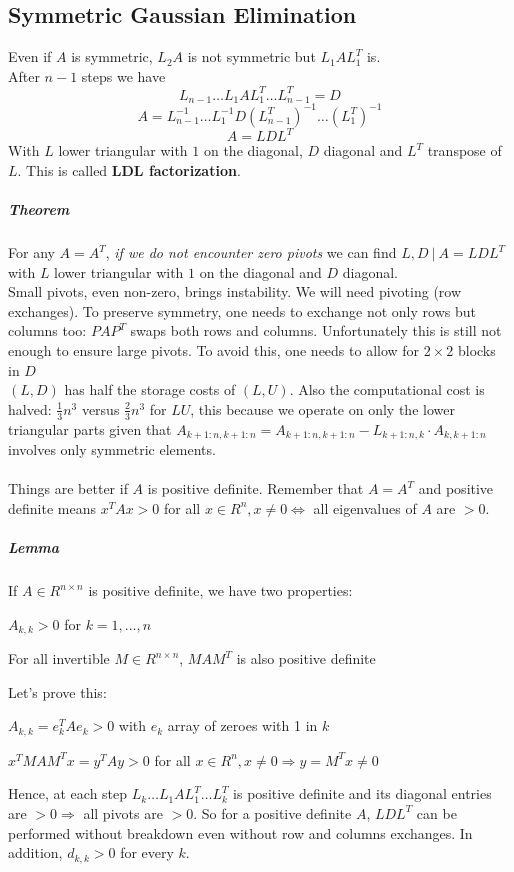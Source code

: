 \documentclass[10pt]{report}
\begin{document}
\subsection{Symmetric Gaussian Elimination} Even if $A$ is symmetric, $L_2A$ is not symmetric but $L_1AL_1^T$ is.\\
After $n-1$ steps we have $$L_{n-1}\ldots L_1AL_1^T\ldots L_{n-1}^T = D$$
$$A = L_{n-1}^{-1}\ldots L_1^{-1} D (L_{n-1}^T)^{-1}\ldots(L_1^T)^{-1}$$
$$A = L D L^T$$
With $L$ lower triangular with $1$ on the diagonal, $D$ diagonal and $L^T$ transpose of $L$. This is called \textbf{LDL factorization}.
\subparagraph{Theorem} For any $A=A^T$, \textit{if we do not encounter zero pivots} we can find $L,D\:|\:A = L DL^T$ with $L$ lower triangular with $1$ on the diagonal and $D$ diagonal.\\
Small pivots, even non-zero, brings instability. We will need pivoting (row exchanges). To preserve symmetry, one needs to exchange not only rows but columns too: $PAP^T$ swaps both rows and columns. Unfortunately this is still not enough to ensure large pivots. To avoid this, one needs to allow for $2\times 2$ blocks in $D$\\
$(L,D)$ has half the storage costs of $(L,U)$. Also the computational cost is halved: $\frac{1}{3}n^3$ versus $\frac{2}{3}n^3$ for $LU$, this because we operate on only the lower triangular parts given that $A_{k+1:n,k+1:n} = A_{k+1:n,k+1:n}-L_{k+1:n,k}\cdot A_{k,k+1:n}$ involves only symmetric elements.\\\\
Things are better if $A$ is positive definite. Remember that $A = A^T$ and positive definite means $x^TAx>0$ for all $x\in R^n,x\neq 0\Leftrightarrow$ all eigenvalues of $A$ are $>0$.
\subparagraph{Lemma} If $A\in R^{n\times n}$ is positive definite, we have two properties:
\begin{list}{}{}
	\item $A_{k,k}>0$ for $k=1,\ldots,n$
	\item For all invertible $M\in R^{n\times n}$, $MAM^T$ is also positive definite
\end{list}
Let's prove this: \begin{list}{}{}
	\item $A_{k,k}=e_k^TAe_k > 0$ with $e_k$ array of zeroes with 1 in $k$
	\item $x^TMAM^Tx = y^TAy > 0$ for all $x\in R^n, x\neq 0\Rightarrow y= M^Tx \neq 0$
\end{list}
Hence, at each step $L_k\ldots L_1AL_1^T\ldots L_k^T$ is positive definite and its diagonal entries are $>0\Rightarrow$ all pivots are $>0$. So for a positive definite $A$, $LDL^T$ can be performed without breakdown even without row and columns exchanges. In addition, $d_{k,k}>0$ for every $k$.
\end{document}
